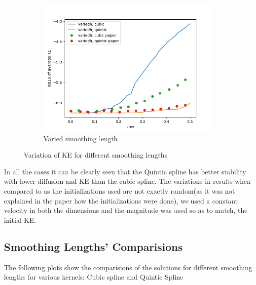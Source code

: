 \begin{figure}[H]
\begin{subfigure}[b]{0.5\textwidth}
\centering
\includegraphics[width=\linewidth]{./case12.png}
\caption{Varied smoothing length}
\end{subfigure}
\caption{Variation of KE for different smoothing lengths}
\end{figure}

In all the cases it can be clearly seen that the Quintic spline has better stability with lower diffusion and KE than the cubic spline. The variations in results when compared to \citep{Morris} as the initializations used are not exactly random(as it was not explained in the paper how the initializations were done),
we used a constant velocity in both the dimensions and the magnitude was used so as to match, the initial KE. 

\subsection{Smoothing Lengths' Comparisions}

The following plots show the comparisions of the solutions for different smoothing lengths for various kernels: Cubic spline and Quintic Spline

